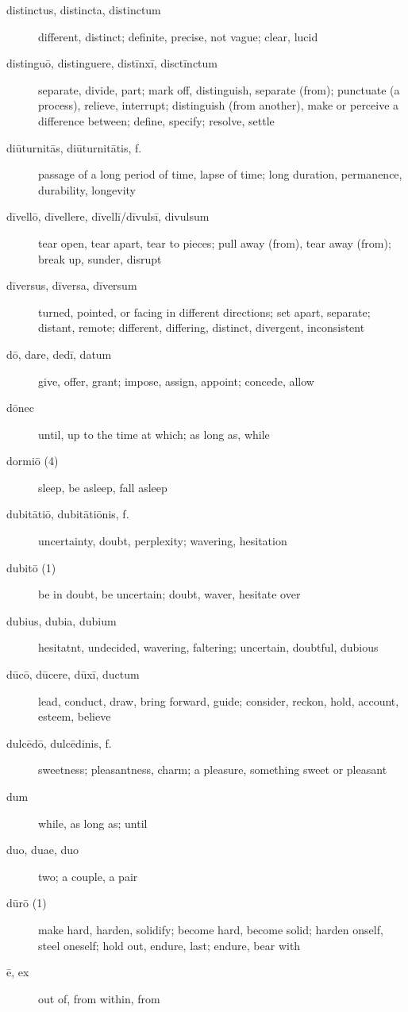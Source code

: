 \begin{description}
    \item[distinctus, distincta, distinctum] \marginnote{*}different, distinct; definite, precise, not vague; clear, lucid
    \item[distinguō, distinguere, distīnxī, disctīnctum] separate, divide, part; mark off, distinguish, separate (from); punctuate (a process), relieve, interrupt; distinguish (from another), make or perceive a difference between; define, specify; resolve, settle
    \item[diūturnitās, diūturnitātis, f.] passage of a long period of time, lapse of time; long duration, permanence, durability, longevity
    \item[dīvellō, dīvellere, dīvellī/dīvulsī, divulsum] tear open, tear apart, tear to pieces; pull away (from), tear away (from); break up, sunder, disrupt
    \item[dīversus, dīversa, dīversum] turned, pointed, or facing in different directions; set apart, separate; distant, remote; different, differing, distinct, divergent, inconsistent
    \item[dō, dare, dedī, datum] \marginnote{*}give, offer, grant; impose, assign, appoint; concede, allow
    \item[dōnec] \marginnote{*}until, up to the time at which; as long as, while
    \item[dormiō (4)] \marginnote{*}sleep, be asleep, fall asleep
    \item[dubitātiō, dubitātiōnis, f.] uncertainty, doubt, perplexity; wavering, hesitation
    \item[dubitō (1)] \marginnote{*}be in doubt, be uncertain; doubt, waver, hesitate over
    \item[dubius, dubia, dubium] \marginnote{*}hesitatnt, undecided, wavering, faltering; uncertain, doubtful, dubious
    \item[dūcō, dūcere, dūxī, ductum] \marginnote{*}lead, conduct, draw, bring forward, guide; consider, reckon, hold, account, esteem, believe
    \item[dulcēdō, dulcēdinis, f.] sweetness; pleasantness, charm; a pleasure, something sweet or pleasant
    \item[dum] \marginnote{*}while, as long as; until
    \item[duo, duae, duo] \marginnote{*}two; a couple, a pair
    \item[dūrō (1)] make hard, harden, solidify; become hard, become solid; harden onself, steel oneself; hold out, endure, last; endure, bear with
    \item[ē, ex] \marginnote{*}out of, from within, from

\end{description}
